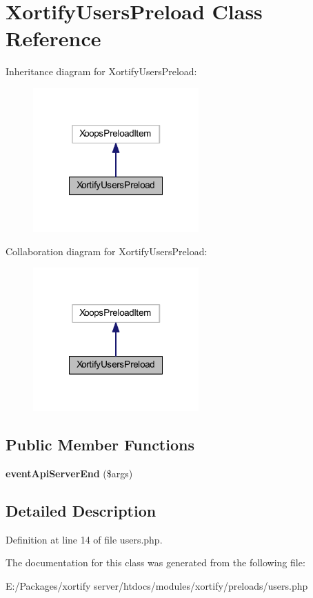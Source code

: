 \hypertarget{class_xortify_users_preload}{\section{Xortify\-Users\-Preload Class Reference}
\label{class_xortify_users_preload}
}


Inheritance diagram for Xortify\-Users\-Preload\-:
\nopagebreak
\begin{figure}[H]
\begin{center}
\leavevmode
\includegraphics[width=180pt]{class_xortify_users_preload__inherit__graph}
\end{center}
\end{figure}


Collaboration diagram for Xortify\-Users\-Preload\-:
\nopagebreak
\begin{figure}[H]
\begin{center}
\leavevmode
\includegraphics[width=180pt]{class_xortify_users_preload__coll__graph}
\end{center}
\end{figure}
\subsection*{Public Member Functions}
\begin{DoxyCompactItemize}
\item 
\hypertarget{class_xortify_users_preload_a62e459a2f1d1676b74b93eaa0e01bd02}{{\bfseries event\-Api\-Server\-End} (\$args)}\label{class_xortify_users_preload_a62e459a2f1d1676b74b93eaa0e01bd02}

\end{DoxyCompactItemize}


\subsection{Detailed Description}


Definition at line 14 of file users.\-php.



The documentation for this class was generated from the following file\-:\begin{DoxyCompactItemize}
\item 
E\-:/\-Packages/xortify server/htdocs/modules/xortify/preloads/users.\-php\end{DoxyCompactItemize}
